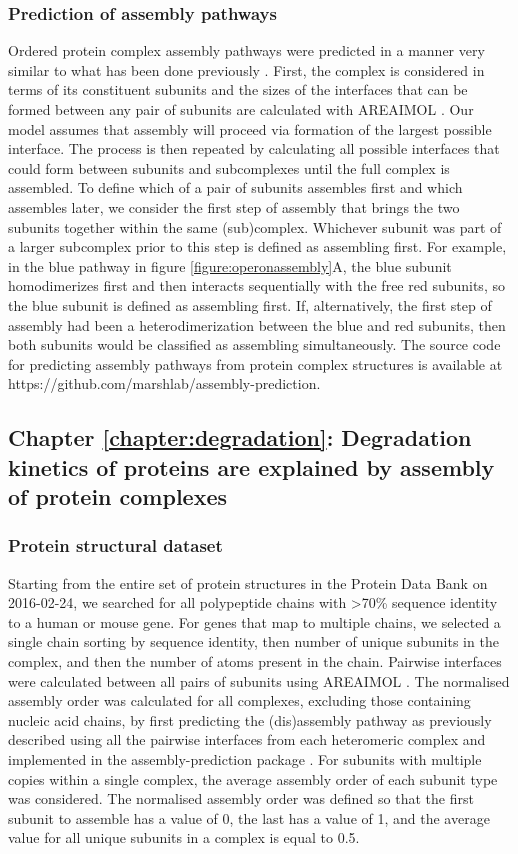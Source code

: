 \documentclass[a4paper,11pt,twoside,openright]{scrbook}
\begin{document}
\subsubsection{Prediction of assembly pathways}
Ordered protein complex assembly pathways were predicted in a manner very
similar to what has been done previously \cite{Marsh2013}. First, the complex is
considered in terms of its constituent subunits and the sizes of the interfaces
that can be formed between any pair of subunits are calculated with AREAIMOL
\cite{Winn2011}. Our model assumes that assembly will proceed via formation of
the largest possible interface. The process is then repeated by calculating all
possible interfaces that could form between subunits and subcomplexes until the
full complex is assembled. To define which of a pair of subunits assembles first
and which assembles later, we consider the first step of assembly that brings
the two subunits together within the same (sub)complex. Whichever subunit was
part of a larger subcomplex prior to this step is defined as assembling first.
For example, in the blue pathway in figure \ref{figure:operonassembly}A, the
blue subunit homodimerizes first and then interacts sequentially with the free
red subunits, so the blue subunit is defined as assembling first. If,
alternatively, the first step of assembly had been a heterodimerization between
the blue and red subunits, then both subunits would be classified as assembling
simultaneously. The source code for predicting assembly pathways from protein
complex structures is available at
https://github.com/marshlab/assembly-prediction.

\clearpage
\subsection{Chapter \ref*{chapter:degradation}: Degradation kinetics of proteins
are explained by assembly of protein complexes}

\subsubsection{Protein structural dataset}
Starting from the entire set of protein structures in the Protein Data Bank on
2016-02-24, we searched for all polypeptide chains with >70\% sequence identity
to a human or mouse gene. For genes that map to multiple chains, we selected a
single chain sorting by sequence identity, then number of unique subunits in the
complex, and then the number of atoms present in the chain. Pairwise interfaces
were calculated between all pairs of subunits using AREAIMOL \cite{Winn2011}.
The normalised assembly order was calculated for all complexes, excluding those
containing nucleic acid chains, by first predicting the (dis)assembly pathway as
previously described using all the pairwise interfaces from each heteromeric
complex \cite{Marsh2013} and implemented in the assembly-prediction package
\cite{Wells2016}. For subunits with multiple copies within a single complex, the
average assembly order of each subunit type was considered. The normalised
assembly order was defined so that the first subunit to assemble has a value of
0, the last has a value of 1, and the average value for all unique subunits in a
complex is equal to 0.5.
\end{document}
